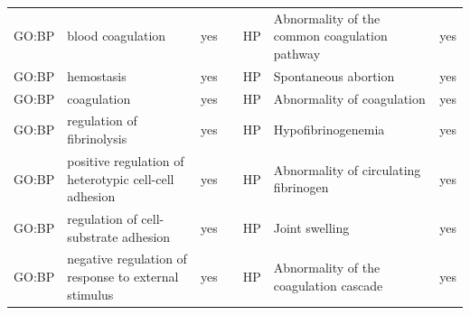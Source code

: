 \begin{longtable}{@{}lp{5cm}lllp{5cm}l@{}}
GO:BP           & blood coagulation                                                                                                                  & yes              &           & HP              & Abnormality of the common coagulation pathway                                                                                                                          & yes              \\
GO:BP           & hemostasis                                                                                                                         & yes              &           & HP              & Spontaneous abortion                                                                                                                                                   & yes              \\
GO:BP           & coagulation                                                                                                                        & yes              &           & HP              & Abnormality of coagulation                                                                                                                                             & yes              \\
GO:BP           & regulation of fibrinolysis                                                                                                         & yes              &           & HP              & Hypofibrinogenemia                                                                                                                                                     & yes              \\
GO:BP           & positive regulation of heterotypic cell-cell adhesion                                                                              & yes              &           & HP              & Abnormality of circulating fibrinogen                                                                                                                                  & yes              \\
GO:BP           & regulation of cell-substrate adhesion                                                                                              & yes              &           & HP              & Joint swelling                                                                                                                                                         & yes              \\
GO:BP           & negative regulation of response to external stimulus                                                                               & yes              &           & HP              & Abnormality of the coagulation cascade                                                                                                                                 & yes              \\

\end{longtable}
